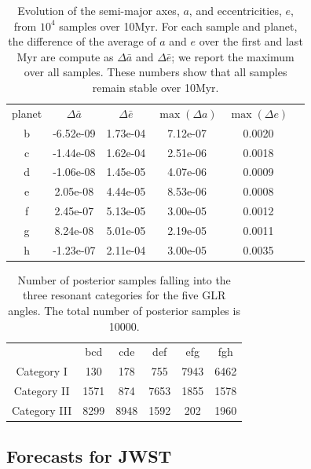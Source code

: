 \documentclass[twocolumn]{aastex63}
\begin{document}
\begin{table}
\centering
\begin{tabular}{|c|c c c c c}
planet & $\Delta \bar{a}$ & $\Delta \bar{e}$ & $\max (\Delta a)$ & $\max(\Delta e)$ &\\ 
b      & -6.52e-09  & 1.73e-04 & 7.12e-07  & 0.0020 \\
c      & -1.44e-08  & 1.62e-04 & 2.51e-06  & 0.0018 \\
d      & -1.06e-08  & 1.45e-05 & 4.07e-06  & 0.0009 \\
e      &  2.05e-08  & 4.44e-05 & 8.53e-06  & 0.0008 \\
f      &  2.45e-07  & 5.13e-05 & 3.00e-05  & 0.0012 \\
g      &  8.24e-08  & 5.01e-05 & 2.19e-05  & 0.0011 \\
h      & -1.23e-07  & 2.11e-04 & 3.00e-05  & 0.0035

\end{tabular}
\caption{Evolution of the semi-major axes, $a$, and eccentricities, $e$, from $10^4$ samples over 10Myr. For each sample and planet, the difference of the average of $a$ and $e$ over the first and last Myr are compute as $\Delta \bar{a}$ and  $\Delta \bar{e}$; we report the maximum over all samples. These numbers show that all samples remain stable over 10Myr.}
\label{tab:averageAE}
\end{table}


\begin{table}
\centering
\begin{tabular}{|c|c c c c c} 
  &                   bcd     & cde   & def   & efg   & fgh \\
 Category I         & 130     & 178   & 755   & 7943  & 6462 \\
 Category II        & 1571    & 874   & 7653  & 1855  & 1578 \\
 Category III       & 8299    & 8948  & 1592  & 202   & 1960

\end{tabular}
\caption{Number of posterior samples falling into the three resonant categories for the five GLR angles. The total number of posterior samples is 10000.}
\label{tab:cat}
\end{table}




\subsection{Forecasts for JWST}
\end{document}

